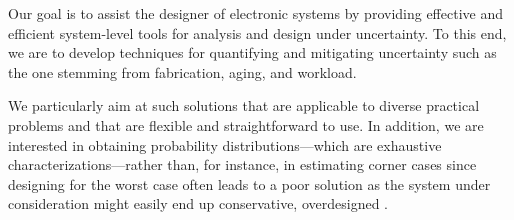Our goal is to assist the designer of electronic systems by providing effective
and efficient system-level tools for analysis and design under uncertainty. To
this end, we are to develop techniques for quantifying and mitigating
uncertainty such as the one stemming from fabrication, aging, and workload.

We particularly aim at such solutions that are applicable to diverse practical
problems and that are flexible and straightforward to use. In addition, we are
interested in obtaining probability distributions---which are exhaustive
characterizations---rather than, for instance, in estimating corner cases since
designing for the worst case often leads to a poor solution as the system under
consideration might easily end up conservative, overdesigned \cite{quinton2012}.
